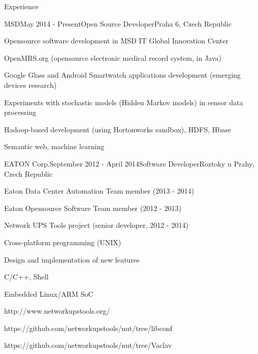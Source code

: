 \documentclass{resume} %
\begin{document}
\begin{rSection}{Experience}

\begin{rSubsection}{MSD}{May 2014 - Present}{Open Source Developer}{Praha 6, Czech Republic}
\item Opensource software development in MSD IT Global Innovation Center
\item OpenMRS.org (opensource electronic medical record system, in Java)
\item Google Glass and Android Smartwatch applications development (emerging devices research)
\item Experiments with stochastic models (Hidden Markov models) in sensor data processing
\item Hadoop-based development (using Hortonworks sandbox), HDFS, Hbase
\item Semantic web, machine learning
\end{rSubsection}


\begin{rSubsection}{EATON Corp.}{September 2012 - April 2014}{Software Developer}{Roztoky u Prahy, Czech Republic}
\item Eaton Data Center Automation Team member (2013 - 2014)
\item Eaton Opensource Software Team member (2012 - 2013)
\item Network UPS Tools project (senior developer, 2012 - 2014)
\item Cross-platform programming (UNIX)
\item Design and implementation of new features
\item C/C++, Shell
\item Embedded Linux/ARM SoC
\item http://www.networkupstools.org/
\item https://github.com/networkupstools/nut/tree/libconf
\item https://github.com/networkupstools/nut/tree/Vaclav
\end{rSubsection}



\end{rSection}
\end{document}
